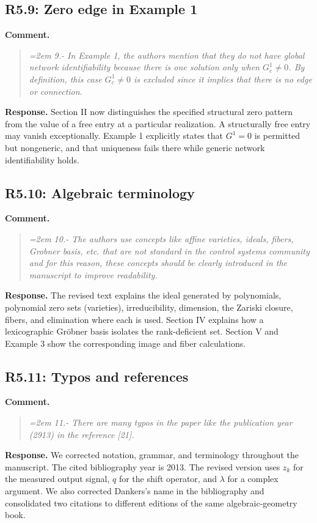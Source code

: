 \documentclass[11pt]{article}
\begin{document}
\subsection*{R5.9: Zero edge in Example 1}
\textbf{Comment.}
\begin{quote}\itshape\emergencystretch=2em
9.- In Example 1, the authors mention that they do not have global network identifiability because there is one solution only when $G_c^1
\neq 0$. By definition, this case $G_c^1 \neq 0$ is excluded since it implies that there is no edge or connection.
\end{quote}

\textbf{Response.} Section II now distinguishes the specified structural
zero pattern from the value of a free entry at a particular realization.
A structurally free entry may vanish exceptionally. Example 1 explicitly
states that $G^1=0$ is permitted but nongeneric, and that uniqueness
fails there while generic network identifiability holds.

\subsection*{R5.10: Algebraic terminology}
\textbf{Comment.}
\begin{quote}\itshape\emergencystretch=2em
10.- The authors use concepts like affine varieties, ideals, fibers, Grobner basis, etc. that are not standard in the control systems community and for this reason, these concepts should be clearly introduced in the manuscript to improve readability.
\end{quote}

\textbf{Response.} The revised text explains the ideal generated by
polynomials, polynomial zero sets (varieties), irreducibility,
dimension, the Zariski closure, fibers, and elimination where each is
used. Section IV explains how a lexicographic Gr\"obner basis isolates
the rank-deficient set. Section V and Example 3 show the corresponding
image and fiber calculations.

\subsection*{R5.11: Typos and references}
\textbf{Comment.}
\begin{quote}\itshape\emergencystretch=2em
11.- There are many typos in the paper like the publication year (2913) in the reference [21].
\end{quote}

\textbf{Response.} We corrected notation, grammar, and terminology
throughout the manuscript. The cited bibliography year is 2013.
The revised version uses $z_k$ for the measured output signal,
$q$ for the shift operator, and $\lambda$ for a complex argument.
We also corrected Dankers's name in the bibliography and consolidated
two citations to different editions of the same algebraic-geometry book.
\end{document}
